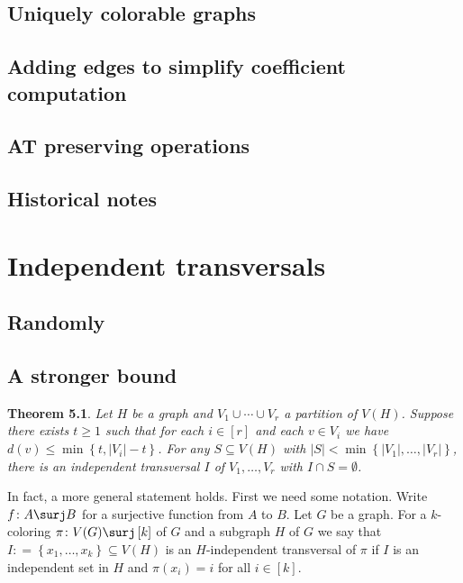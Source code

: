 \documentclass[openany]{tufte-book} %
\theoremstyle{plain}
\newtheorem{theorem}{Theorem}
\newcommand{\set}[1]{\left\{ #1 \right\}}
\newcommand{\card}[1]{\left|#1\right|}
\newcommand{\funcsurj}[3]{#1\colon #2 \surj #3}
\newcommand{\irange}[1]{\left[#1\right]}
\newcommand{\DefinedAs}{\mathrel{\mathop:}=}
\begin{document}
\section{Uniquely colorable graphs}
\section{Adding edges to simplify coefficient computation}
\section{AT preserving operations}
\section{Historical notes}

\chapter{Independent transversals}

\section{Randomly}
\section{A stronger bound}
\begin{theorem}\label{LopsidedTransversal}
Let $H$ be a graph and $V_1 \cup \cdots \cup V_r$ a partition of $V(H)$.  
Suppose there exists $t \geq 1$ such that for each $i \in \irange{r}$ and each $v \in V_i$ we have $d(v) \leq \min\set{t, \card{V_i}-t}$.  For any $S \subseteq V(H)$ with $\card{S} < \min\set{\card{V_1}, \ldots, \card{V_r}}$, there is an independent transversal $I$ of $V_1, \ldots, V_r$ with $I \cap S = \emptyset$.
\end{theorem}

In fact, a more general statement holds. 
First we need some notation. 
Write $\funcsurj{f}{A}{B}$ for a surjective function from $A$ to $B$.  
Let $G$ be a graph.  
For a $k$-coloring $\funcsurj{\pi}{V(G)}{\irange{k}}$ of $G$ and a subgraph $H$ of $G$ we say 
that $I \DefinedAs \set{x_1, \ldots, x_k} \subseteq V(H)$ is an $H$-independent transversal of $\pi$ if $I$ is an independent 
set in $H$ and $\pi(x_i) = i$ for all $i \in \irange{k}$.
\end{document}
